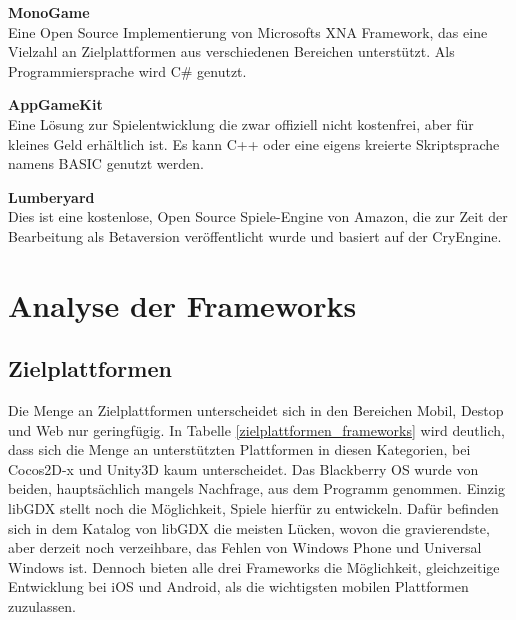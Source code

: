 \bigskip
\textbf{MonoGame}\\
Eine Open Source Implementierung von Microsofts XNA Framework, das eine Vielzahl an Zielplattformen aus verschiedenen Bereichen unterstützt. Als Programmiersprache wird C\# genutzt. \citep{monogame}

\bigskip
\textbf{AppGameKit}\\
Eine Lösung zur Spielentwicklung die zwar offiziell nicht kostenfrei, aber für kleines Geld erhältlich ist. Es kann C++ oder eine eigens kreierte Skriptsprache namens BASIC genutzt werden. \citep{appgamekit}

\bigskip
\textbf{Lumberyard}\\
Dies ist eine kostenlose, Open Source Spiele-Engine von Amazon, die zur Zeit der Bearbeitung als Betaversion veröffentlicht wurde und basiert auf der CryEngine. \citep{lumberyard}


\chapter{Analyse der Frameworks}
\label{chapter:Analyse_der_Frameworks}


\section{Zielplattformen}
Die Menge an Zielplattformen unterscheidet sich in den Bereichen Mobil, Destop und Web nur geringfügig. In Tabelle \ref{zielplattformen_frameworks} wird deutlich, dass sich die Menge an unterstützten Plattformen in diesen Kategorien, bei Cocos2D-x und Unity3D kaum unterscheidet. Das Blackberry OS wurde von beiden, hauptsächlich mangels Nachfrage, aus dem Programm genommen. Einzig libGDX stellt noch die Möglichkeit, Spiele hierfür zu entwickeln. Dafür befinden sich in dem Katalog von libGDX die meisten Lücken, wovon die gravierendste, aber derzeit noch verzeihbare, das Fehlen von Windows Phone und Universal Windows ist. Dennoch bieten alle drei Frameworks die Möglichkeit, gleichzeitige Entwicklung bei iOS und Android, als die wichtigsten mobilen Plattformen zuzulassen. 

